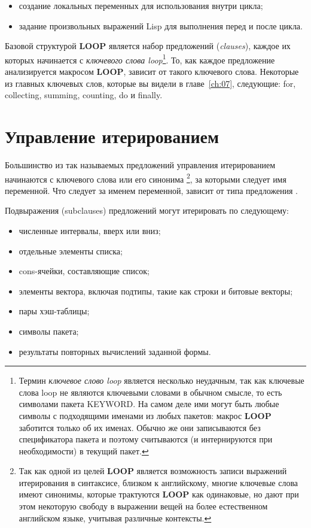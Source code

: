 \begin{itemize}
\item создание локальных переменных для использования внутри цикла;
\item задание произвольных выражений Lisp для выполнения перед и после цикла.
\end{itemize}

Базовой структурой \textbf{LOOP} является набор предложений (\textit{clauses}), каждое их
которых начинается с \textit{ключевого слова loop}\footnote{Термин \textit{ключевое слово
    loop} является несколько неудачным, так как ключевые слова loop не являются ключевыми
  словами в обычном смысле, то есть символами пакета KEYWORD. На самом деле ими могут быть
  любые символы с подходящими именами из любых пакетов: макрос \textbf{LOOP} заботится
  только об их именах. Обычно же они записываются без спецификатора пакета и поэтому
  считываются (и интернируются при необходимости) в текущий пакет.}. То, как каждое
предложение анализируется макросом \textbf{LOOP}, зависит от такого ключевого
слова. Некоторые из главных ключевых слов, которые вы видели в главе~\ref{ch:07},
следующие: for, collecting, summing, counting, do и finally.

\section{Управление итерированием}

Большинство из так называемых предложений управления итерированием начинаются с ключевого
слова   или его синонима \footnote{Так как одной из целей
  \textbf{LOOP} является возможность записи выражений итерирования в синтаксисе, близком к
  английскому, многие ключевые слова имеют синонимы, которые трактуются \textbf{LOOP} как
  одинаковые, но дают при этом некоторую свободу в выражении вещей на более естественном
  английском языке, учитывая различные контексты.}, за которыми следует имя переменной. Что
следует за именем переменной, зависит от типа предложения .

Подвыражения (subclauses) предложений  могут итерировать по следующему:
\begin{itemize}
\item численные интервалы, вверх или вниз;
\item отдельные элементы списка;
\item cons-ячейки, составляющие список;
\item элементы вектора, включая подтипы, такие как строки и битовые векторы;
\item пары хэш-таблицы;
\item символы пакета;
\item результаты повторных вычислений заданной формы.
\end{itemize}


